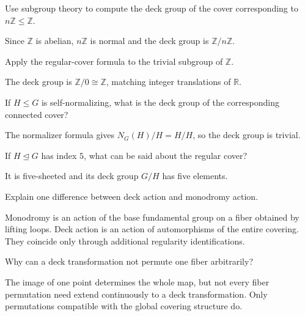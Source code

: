 \begin{problem}\label{prob:viii12-11}
Use subgroup theory to compute the deck group of the cover corresponding to \(n\mathbb Z\le\mathbb Z\).
\end{problem}
\begin{solution}
Since \(\mathbb Z\) is abelian, \(n\mathbb Z\) is normal and the deck group is \(\mathbb Z/n\mathbb Z\).
\end{solution}

\begin{problem}\label{prob:viii12-12}
Apply the regular-cover formula to the trivial subgroup of \(\mathbb Z\).
\end{problem}
\begin{solution}
The deck group is \(\mathbb Z/0\cong\mathbb Z\), matching integer translations of \(\mathbb R\).
\end{solution}

\begin{problem}\label{prob:viii12-13}
If \(H\le G\) is self-normalizing, what is the deck group of the corresponding connected cover?
\end{problem}
\begin{solution}
The normalizer formula gives \(N_G(H)/H=H/H\), so the deck group is trivial.
\end{solution}

\begin{problem}\label{prob:viii12-14}
If \(H\trianglelefteq G\) has index \(5\), what can be said about the regular cover?
\end{problem}
\begin{solution}
It is five-sheeted and its deck group \(G/H\) has five elements.
\end{solution}

\begin{problem}\label{prob:viii12-15}
Explain one difference between deck action and monodromy action.
\end{problem}
\begin{solution}
Monodromy is an action of the base fundamental group on a fiber obtained by lifting loops.  Deck action is an action of automorphisms of the entire covering.  They coincide only through additional regularity identifications.
\end{solution}

\begin{problem}\label{prob:viii12-16}
Why can a deck transformation not permute one fiber arbitrarily?
\end{problem}
\begin{solution}
The image of one point determines the whole map, but not every fiber permutation need extend continuously to a deck transformation.  Only permutations compatible with the global covering structure do.
\end{solution}

